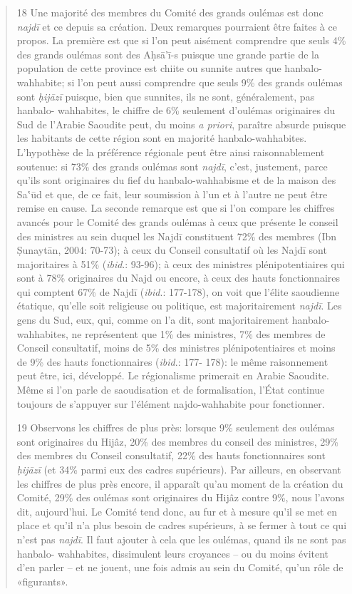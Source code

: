 \begin{quote}
18 Une majorité des membres du Comité des grands oulémas est donc
\emph{najdī} et ce depuis sa création. Deux remarques pourraient être
faites à ce propos. La première est que si l'on peut aisément comprendre
que seuls 4\% des grands oulémas sont des Aḥsā'ī-s puisque une grande
partie de la population de cette province est chiite ou sunnite autres
que hanbalo-wahhabite; si l'on peut aussi comprendre que seuls 9\% des
grands oulémas sont \emph{ḥijāzī} puisque, bien que sunnites, ils ne
sont, généralement, pas hanbalo- wahhabites, le chiffre de 6\% seulement
d'oulémas originaires du Sud de l'Arabie Saoudite peut, du moins \emph{a
priori}, paraître absurde puisque les habitants de cette région sont en
majorité hanbalo-wahhabites. L'hypothèse de la préférence régionale peut
être ainsi raisonnablement soutenue: si 73\% des grands oulémas sont
\emph{najdī}, c'est, justement, parce qu'ils sont originaires du fief du
hanbalo-wahhabisme et de la maison
des Sa‛ūd et que, de ce fait, leur soumission à l'un et à l'autre ne
peut être remise en cause. La seconde remarque est que si l'on compare
les chiffres avancés pour le Comité des grands oulémas à ceux que
présente le conseil des ministres au sein duquel les Najdī constituent
72\% des membres (Ibn Ṣunaytān, 2004: 70-73); à ceux du Conseil
consultatif où les Najdī sont majoritaires à 51\% (\emph{ibid}.: 93-96);
à ceux des ministres plénipotentiaires qui sont à 78\% originaires du
Najd ou encore, à ceux des hauts fonctionnaires qui comptent 67\% de
Najdī (\emph{ibid}.: 177-178), on voit que l'élite saoudienne étatique,
qu'elle soit religieuse ou politique, est majoritairement \emph{najdī}.
Les gens du Sud, eux, qui, comme on l'a dit, sont majoritairement
hanbalo-wahhabites, ne représentent que 1\% des ministres, 7\% des
membres de Conseil consultatif, moins de 5\% des ministres
plénipotentiaires et moins de 9\% des hauts fonctionnaires
(\emph{ibid}.: 177- 178): le même raisonnement peut être, ici,
développé. Le régionalisme primerait en Arabie Saoudite. Même si l'on
parle de saoudisation et de formalisation, l'État continue toujours de
s'appuyer sur l'élément najdo-wahhabite pour fonctionner.

19 Observons les chiffres de plus près: lorsque 9\% seulement des
oulémas sont originaires du Hijâz, 20\% des membres du conseil des
ministres, 29\% des membres du Conseil consultatif, 22\% des hauts
fonctionnaires sont \emph{ḥijāzī} (et 34\% parmi eux des cadres
supérieurs). Par ailleurs, en observant les chiffres de plus près
encore, il apparaît qu'au moment de la création du Comité, 29\% des
oulémas sont originaires du Hijâz contre 9\%, nous l'avons dit,
aujourd'hui. Le Comité tend donc, au fur et à mesure qu'il se met en
place et qu'il n'a plus besoin de cadres supérieurs, à se fermer à tout
ce qui n'est pas \emph{najdī}. Il faut ajouter à cela que les oulémas,
quand ils ne sont pas hanbalo- wahhabites, dissimulent leurs croyances
-- ou du moins évitent d'en parler -- et ne jouent, une fois admis au
sein du Comité, qu'un rôle de «figurants».


\end{quote}
